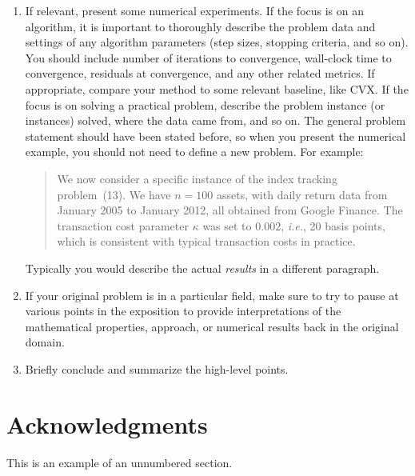 \documentclass[12pt]{article}
\begin{document}
\begin{enumerate}
\item If relevant, present some numerical experiments. If the focus is on an
algorithm, it is important to
thoroughly describe the problem data and settings of any algorithm parameters
(step sizes, stopping criteria, and so on). You should include number of
iterations to convergence, wall-clock time to convergence, residuals at
convergence, and any other related metrics. If appropriate, compare your method
to some relevant baseline, like CVX.
If the focus is on solving a practical problem, describe the 
problem instance (or instances) solved, where the data came from, and so on.
The general problem statement should have been stated before, so when you present
the numerical example, you should not need to define a new problem.
For example:
\begin{quote}
We now consider a specific instance of the index tracking problem~(13).  We
have $n=100$ assets, with daily return data from January 2005 to January 2012,
all obtained from Google Finance.  The transaction cost parameter $\kappa$ was
set to $0.002$, \emph{i.e.}, 20 basis points, which is consistent with typical
transaction costs in practice.
\end{quote}

Typically you would describe the actual \emph{results} in a different paragraph.

\item If your original problem is in a particular field, make sure to try to
pause at various points in the exposition to provide interpretations of the
mathematical properties, approach, or numerical results back in the original
domain.

\item Briefly conclude and summarize the high-level points.
\end{enumerate}

\section*{Acknowledgments}

This is an example of an unnumbered section.

\newpage

\end{document}

